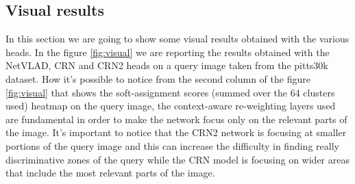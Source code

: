 \documentclass[10pt,twocolumn,letterpaper]{article}
\begin{document}
\subsection{Visual results}
In this section we are going to show some visual results obtained with the various heads. In the figure \ref{fig:visual} we are 
reporting the results obtained with the NetVLAD, CRN and CRN2 heads on a query image taken from the pitts30k dataset. How it's 
possible to notice from the second column of the figure \ref{fig:visual} that shows the soft-assignment scores (summed over the 64 clusters used) heatmap 
on the query 
image, the context-aware re-weighting layers used are fundamental in order to make the network focus only on the relevant parts of the image.
It's important to notice that the CRN2 network is focusing at smaller portions of the query image and this can increase the difficulty in finding 
really discriminative zones of the query while the CRN model is focusing on wider areas that include the most relevant parts of the image.
\end{document}
